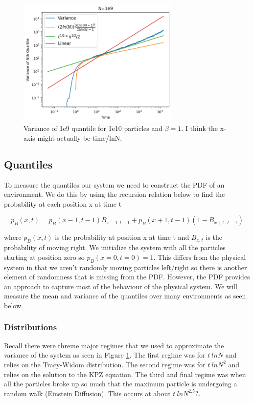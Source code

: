 \documentclass{article}
\begin{document}
\begin{figure}[H]
\centering
\includegraphics[width=8cm]{Var1e9}
\caption{Variance of 1e9 quantile for 1e10 particles and $\beta=1$. I think the x-axis might actually be time/lnN.}
\label{fig:Variance}
\end{figure}

\subsection{Quantiles} 
\indent\indent To measure the quantiles our system we need to construct the PDF of an environment. We do this by using the recursion relation below to find the probability at each position x at time t

\begin{equation}
p_{B}(x, t) = p_{B}(x-1, t-1)B_{x-1, t-1} + p_{B}(x+1, t-1)(1 - B_{x+1, t-1})
\end{equation}

where $p_{B}(x,t)$ is the probability at position x at time t and $B_{x, t}$ is the probability of moving right. We initialize the system with all the particles starting at position zero so $p_{B}(x=0, t=0) = 1$. This differs from the physical system in that we aren't randomly moving particles left/right so there is another element of randomness that is missing from the PDF. However, the PDF provides an approach to capture most of the behaviour of the physical system. We will measure the mean and variance of the quantiles over many environments as seen below. 

\subsubsection{Distributions}
\indent\indent Recall there were threme major regimes that we used to approximate the variance of the system as seen in Figure \ref{fig:Variance}. The first regime was for $t~lnN$ and relies on the Tracy-Widom distribution. The second regime was for $t~lnN^2$ and relies on the solution to the KPZ equation. The third and final regime was when all the particles broke up so much that the maximum particle is undergoing a random walk (Einstein Diffusion). This occurs at about $t~lnN^2.5?$. 
\end{document}

